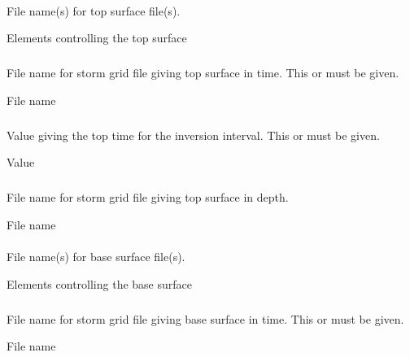 \paragraph{\necessary} 
 \slist
   \item \Description File name(s) for top surface file(s).
   \item \Argument Elements controlling the top surface
   \item \Default
 \elist

\subparagraph{} 
 \slist
   \item \Description File name for storm grid file giving top surface in time. This or  must be given.
   \item \Argument File name
   \item \Default
 \elist

\subparagraph{} 
 \slist
   \item \Description Value giving the top time for the inversion interval. This or  must be given.
   \item \Argument Value
   \item \Default
 \elist

 \subparagraph{} 
 \slist
   \item \Description File name for storm grid file giving top surface in depth.
   \item \Argument File name
   \item \Default
 \elist

\paragraph{\necessary} 
 \slist
   \item \Description File name(s) for base surface file(s).
   \item \Argument Elements controlling the base surface
   \item \Default
 \elist

\subparagraph{} 
\slist
   \item \Description File name for storm grid file giving base surface in time. This or  must be given.
   \item \Argument File name
   \item \Default
\elist


